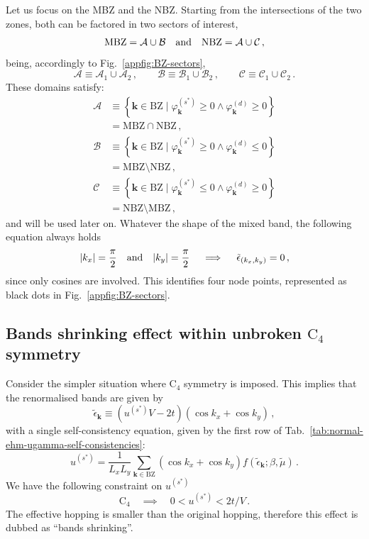 Let us focus on the MBZ and the NBZ. Starting from the intersections of the two zones, both can be factored in two sectors of interest,
\[
	\mathrm{MBZ} = \mathcal{A} \cup \mathcal{B}
	\qq{and}
	\mathrm{NBZ} = \mathcal{A} \cup \mathcal{C} \, ,
\]
being, accordingly to Fig.~\ref{appfig:BZ-sectors},
\[
	\mathcal{A} \equiv \mathcal{A}_1 \cup \mathcal{A}_2 \, ,
	\qquad
	\mathcal{B} \equiv \mathcal{B}_1 \cup \mathcal{B}_2 \, ,
	\qquad
	\mathcal{C} \equiv \mathcal{C}_1 \cup \mathcal{C}_2 \, .
\]
These domains satisfy:
\begin{align}
	\mathcal{A} &\equiv \left\lbrace
	\mathbf{k}\in\mathrm{BZ}
	\mid 
	\varphi_\mathbf{k}^{(s^*)} \ge 0 \land 	\varphi_\mathbf{k}^{(d)} \ge 0
	\right\rbrace \label{appeq:BZ-A-def} \\
	&= \mathrm{MBZ} \cap \mathrm{NBZ} \, , \nonumber\\[0.5em]
	\mathcal{B} &\equiv \left\lbrace
	\mathbf{k}\in\mathrm{BZ}
	\mid 
	\varphi_\mathbf{k}^{(s^*)} \ge 0 \land 	\varphi_\mathbf{k}^{(d)} \le 0
	\right\rbrace \label{appeq:BZ-B-def} \\
	&= \mathrm{MBZ} \setminus \mathrm{NBZ} \, , \nonumber\\[0.5em]
	\mathcal{C} &\equiv \left\lbrace
	\mathbf{k}\in\mathrm{BZ}
	\mid 
	\varphi_\mathbf{k}^{(s^*)} \le 0 \land 	\varphi_\mathbf{k}^{(d)} \ge 0
	\right\rbrace \label{appeq:BZ-C-def} \\
	&= \mathrm{NBZ} \setminus \mathrm{MBZ} \, , \nonumber
\end{align}
and will be used later on. Whatever the shape of the mixed band, the following equation always holds
\[
	\abs{k_x} = \frac{\pi}{2} \qq{and} \abs{k_y} = \frac{\pi}{2}
	\quad\implies\quad
	\tilde{\epsilon}_{(k_x,k_y)} = 0 \, ,
\]
since only cosines are involved. This identifies four node points, represented as black dots in Fig.~\ref{appfig:BZ-sectors}.

\subsection{Bands shrinking effect within unbroken $\mathrm{C}_4$ symmetry}\label{appsubsec:normal-bands-shrinking}

Consider the simpler situation where $\mathrm{C}_4$ symmetry is imposed. This implies that the renormalised bands are given by
\[
	\tilde{\epsilon}_\mathbf{k} \equiv (u^{(s^*)} V - 2t) (\cos k_x + \cos k_y) \, ,
\]
with a single self-consistency equation, given by the first row of Tab.~\ref{tab:normal-ehm-ugamma-self-consistencies}:
\[
	u^{(s^*)} = \frac{1}{L_x L_y} \sum_{\mathbf{k}\in\mathrm{BZ}} (\cos k_x + \cos k_y) f(\tilde{\epsilon}_\mathbf{k};\beta,\tilde{\mu}) \, .
\]
We have the following constraint on $u^{(s^*)}$
\begin{equation}\label{appeq:normal-us*-constraint}
	\mathrm{C}_4
	\quad\implies\quad
	0 < u^{(s^*)} < 2t/V \, .
\end{equation}
The effective hopping is smaller than the original hopping, therefore this effect is dubbed as ``bands shrinking''.

